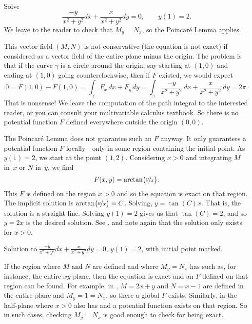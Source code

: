 \begin{example} \label{exact:examplevortex}
Solve
\begin{equation*}
\frac{-y}{x^2+y^2} dx + \frac{x}{x^2+y^2} dy = 0 , \qquad y(1) = 2.
\end{equation*}
We leave to the reader to check that
$M_y = N_x$,
so the Poincar\'e Lemma applies.

This vector field $(M,N)$ is not conservative (the equation is not exact)
if considered as a vector
field of the entire plane minus the origin.  The problem is that if the curve $\gamma$
is a circle around the origin, say starting at $(1,0)$ and
ending at $(1,0)$ going counterclockwise, then if $F$ existed, we would expect
\begin{equation*}
0 = F(1,0) - F(1,0) = \int_\gamma F_x \, dx + F_y \, dy = \int_\gamma \frac{-y}{x^2+y^2} \, dx +
\frac{x}{x^2+y^2} \, dy = 2\pi .
\end{equation*}
That is nonsense!
We leave the computation of the path integral to the interested reader, or
you can consult your multivariable calculus textbook.  So there is no
potential function $F$ defined everywhere outside the origin $(0,0)$.

The Poincar\'e Lemma does not guarantee such an $F$ anyway.
It only guarantees a potential function $F$ locally---only in
some region containing the initial point.  As $y(1) = 2$,
we start at the point $(1,2)$.  Considering $x > 0$ and
integrating $M$ in~$x$ or $N$ in~$y$, we find
\begin{equation*}
F(x,y) = \operatorname{arctan} \bigl( \nicefrac{y}{x} \bigr) .
\end{equation*}
This $F$ is defined on the region $x > 0$ and so the equation is exact on
that region.
The implicit solution is 
$\operatorname{arctan} \bigl( \nicefrac{y}{x} \bigr) = C$.  Solving,
$y = \tan(C) x$.  That is, the solution is a straight line.  Solving $y(1) =
2$ gives us that $\tan(C) = 2$, and so $y= 2x$ is the desired solution.
See , and note again that the solution only exists for
$x > 0$.
\begin{myfig}
\capstart
{}
\caption{Solution to 
$\frac{-y}{x^2+y^2} dx + \frac{x}{x^2+y^2} dy = 0$, $y(1) = 2$,
with initial point marked.\label{exact:y2x}}
\end{myfig}
\end{example}

If the region where $M$ and $N$ are defined and where $M_y=N_x$
has  such as, for instance, the entire $xy$-plane,
then the equation is exact and an $F$ defined on that region can be found.
For example, in ,
$M=2x+y$ and $N=x-1$ are defined in the entire plane and
$M_y = 1 = N_x$, so there a global $F$ exists.
Similarly, in 
the half-plane where $x > 0$ also has 
and a potential function exists on that region.
So in such cases, checking
$M_y = N_x$ is good enough to check for being exact.

